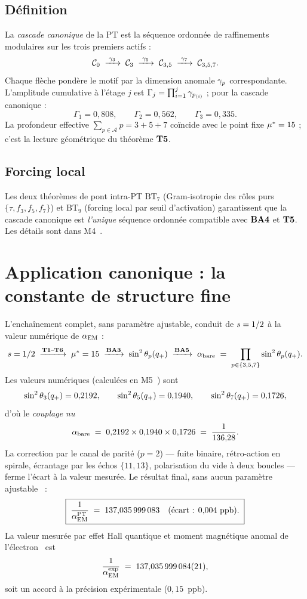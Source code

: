 \subsection{Définition}

La \emph{cascade canonique} de la PT est la séquence ordonnée de raffinements modulaires sur les trois premiers actifs :
\[
\mathcal C_0 \;\xrightarrow{\;\gamma_{3}\;}\; \mathcal C_3
\;\xrightarrow{\;\gamma_{5}\;}\; \mathcal C_{3,5}
\;\xrightarrow{\;\gamma_{7}\;}\; \mathcal C_{3,5,7}.
\]
Chaque flèche pondère le motif par la dimension anomale $\gamma_{p}$ correspondante. L'amplitude cumulative à l'étage $j$ est $\Gamma_j = \prod_{i=1}^{j} \gamma_{p_{(i)}}$ ; pour la cascade canonique :
\[
\Gamma_1 = 0{,}808, \qquad
\Gamma_2 = 0{,}562, \qquad
\Gamma_3 = 0{,}335.
\]
La profondeur effective $\sum_{p \in \mathcal A} p = 3 + 5 + 7$ coïncide avec le point fixe $\mu^{*} = 15$ ; c'est la lecture géométrique du théorème $\textbf{T5}$.

\subsection{Forcing local}

Les deux théorèmes de pont intra-PT $\mathrm{BT}_7$ (Gram-isotropie des rôles purs $\{\tau, f_3, f_5, f_7\}$) et $\mathrm{BT}_9$ (forcing local par seuil d'activation) garantissent que la cascade canonique est \emph{l'unique} séquence ordonnée compatible avec $\textbf{BA4}$ et $\textbf{T5}$. Les détails sont dans M4~\cite{companion_M4}.

\section{Application canonique : la constante de structure fine}
\label{sec:alphaem}

L'enchaînement complet, sans paramètre ajustable, conduit de $s = 1/2$ à la valeur numérique de $\alpha_{\rm EM}$ :
\[
s = 1/2 \;\xrightarrow{\textbf{T1}\text{--}\textbf{T6}}\; \mu^{*} = 15
\;\xrightarrow{\textbf{BA3}}\; \sin^{2}\theta_{p}(q_{+})
\;\xrightarrow{\textbf{BA5}}\; \alpha_{\rm bare} \;=\; \prod_{p\in\{3,5,7\}}\sin^{2}\theta_{p}(q_{+}).
\]
Les valeurs numériques (calculées en M5~\cite{companion_M5}) sont
\[
\sin^{2}\theta_{3}(q_{+}) = 0{,}2192, \qquad
\sin^{2}\theta_{5}(q_{+}) = 0{,}1940, \qquad
\sin^{2}\theta_{7}(q_{+}) = 0{,}1726,
\]
d'où le \emph{couplage nu}
\[
\alpha_{\rm bare} \;=\; 0{,}2192 \times 0{,}1940 \times 0{,}1726
\;=\; \dfrac{1}{136{,}28}.
\]
La correction par le canal de parité ($p = 2$) --- fuite binaire, rétro-action en spirale, écrantage par les échos $\{11, 13\}$, polarisation du vide à deux boucles --- ferme l'écart à la valeur mesurée. Le résultat final, sans aucun paramètre ajustable~\cite{companion_M5} :
\[
\boxed{\;\dfrac{1}{\alpha_{\rm EM}^{\rm PT}} \;=\; 137{,}035\,999\,083 \quad\text{(écart : $0{,}004$~ppb).}\;}
\]
La valeur mesurée par effet Hall quantique et moment magnétique anomal de l'électron~\cite{PDG2024} est
\[
\dfrac{1}{\alpha_{\rm EM}^{\rm exp}} \;=\; 137{,}035\,999\,084(21),
\]
soit un accord à la précision expérimentale ($0{,}15$~ppb).

